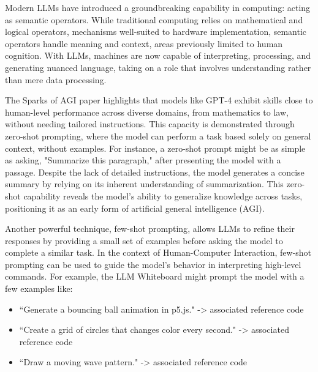 
Modern LLMs have introduced a groundbreaking capability in computing: acting as semantic operators.
While traditional computing relies on mathematical and logical operators, mechanisms well-suited to hardware implementation, semantic operators handle meaning and context, areas previously limited to human cognition.
With LLMs, machines are now capable of interpreting, processing, and generating nuanced language, taking on a role that involves understanding rather than mere data processing.

The Sparks of AGI paper\cite{bubeck2023sparks} highlights that models like GPT-4 exhibit skills close to human-level performance across diverse domains, from mathematics to law, without needing tailored instructions.
This capacity is demonstrated through zero-shot prompting\cite{li2023practical}, where the model can perform a task based solely on general context, without examples.
For instance, a zero-shot prompt might be as simple as asking, "Summarize this paragraph," after presenting the model with a passage.
Despite the lack of detailed instructions, the model generates a concise summary by relying on its inherent understanding of summarization.
This zero-shot capability reveals the model’s ability to generalize knowledge across tasks, positioning it as an early form of artificial general intelligence (AGI).

Another powerful technique, few-shot prompting\cite{brown2020language}, allows LLMs to refine their responses by providing a small set of examples before asking the model to complete a similar task.
In the context of Human-Computer Interaction, few-shot prompting can be used to guide the model’s behavior in interpreting high-level commands.
For example, the LLM Whiteboard might prompt the model with a few examples like:

\begin{itemize}
    \item “Generate a bouncing ball animation in p5.js." -> associated reference code
    \item “Create a grid of circles that changes color every second." -> associated reference code
    \item “Draw a moving wave pattern." -> associated reference code
\end{itemize}

